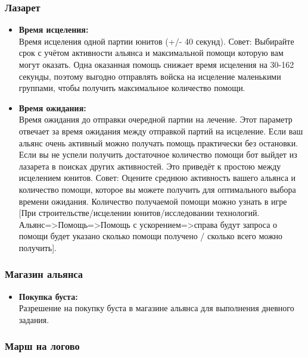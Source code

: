 \documentclass[
]{article}
\providecommand{\tightlist}{%
  \setlength{\itemsep}{0pt}\setlength{\parskip}{0pt}}
\begin{document}
\subsubsection{Лазарет}\label{ux43bux430ux437ux430ux440ux435ux442-1}

\begin{itemize}
\item
  \textbf{Время исцеления:}\\
  Время исцеления одной партии юнитов (+/- 40 секунд). Совет: Выбирайте
  срок с учётом активности альянса и максимальной помощи которую вам
  могут оказать. Одна оказанная помощь снижает время исцеления на 30-162
  секунды, поэтому выгодно отправлять войска на исцеление маленькими
  группами, чтобы получить максимальное количество помощи.
\item
  \textbf{Время ожидания:}\\
  Время ожидания до отправки очередной партии на лечение. Этот параметр
  отвечает за время ожидания между отправкой партий на исцеление. Если
  ваш альянс очень активный можно получать помощь практически без
  остановки. Если вы не успели получить достаточное количество помощи
  бот выйдет из лазарета в поисках других активностей. Это приведёт к
  простою между исцелением юнитов. Совет: Оцените среднюю активность
  вашего альянса и количество помощи, которое вы можете получить для
  оптимального выбора времени ожидания. Количество получаемой помощи
  можно узнать в игре {[}При строительстве/исцелении юнитов/исследовании
  технологий. Альянс=\textgreater Помощь=\textgreater Помощь с
  ускорением=\textgreater справа будут запроса о помощи будет указано
  сколько помощи получено / сколько всего можно получить{]}.
\end{itemize}

\subsubsection{Магазин
альянса}\label{ux43cux430ux433ux430ux437ux438ux43d-ux430ux43bux44cux44fux43dux441ux430}

\begin{itemize}
\tightlist
\item
  \textbf{Покупка буста:}\\
  Разрешение на покупку буста в магазине альянса для выполнения дневного
  задания.
\end{itemize}

\subsubsection{Марш на
логово}\label{ux43cux430ux440ux448-ux43dux430-ux43bux43eux433ux43eux432ux43e}
\end{document}
